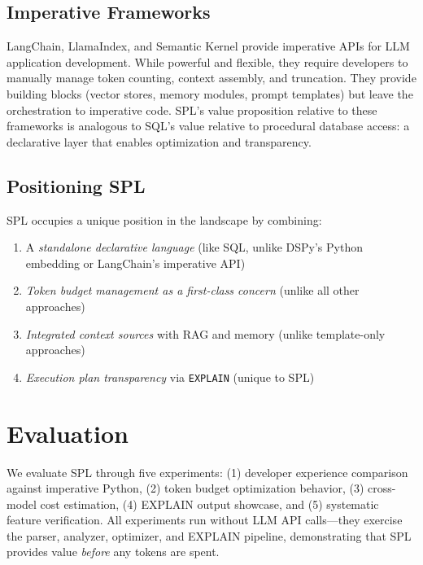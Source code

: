 \documentclass[11pt,a4paper]{article}
\begin{document}
\subsection{Imperative Frameworks}

LangChain, LlamaIndex, and Semantic Kernel provide imperative APIs for LLM application development. While powerful and flexible, they require developers to manually manage token counting, context assembly, and truncation. They provide building blocks (vector stores, memory modules, prompt templates) but leave the orchestration to imperative code. SPL's value proposition relative to these frameworks is analogous to SQL's value relative to procedural database access: a declarative layer that enables optimization and transparency.

\subsection{Positioning SPL}

SPL occupies a unique position in the landscape by combining:

\begin{enumerate}[nosep]
  \item A \emph{standalone declarative language} (like SQL, unlike DSPy's Python embedding or LangChain's imperative API)
  \item \emph{Token budget management as a first-class concern} (unlike all other approaches)
  \item \emph{Integrated context sources} with RAG and memory (unlike template-only approaches)
  \item \emph{Execution plan transparency} via \texttt{EXPLAIN} (unique to SPL)
\end{enumerate}

\section{Evaluation}
\label{sec:evaluation}

We evaluate SPL through five experiments: (1) developer experience comparison against imperative Python, (2) token budget optimization behavior, (3) cross-model cost estimation, (4) EXPLAIN output showcase, and (5) systematic feature verification. All experiments run without LLM API calls---they exercise the parser, analyzer, optimizer, and EXPLAIN pipeline, demonstrating that SPL provides value \emph{before} any tokens are spent.
\end{document}
